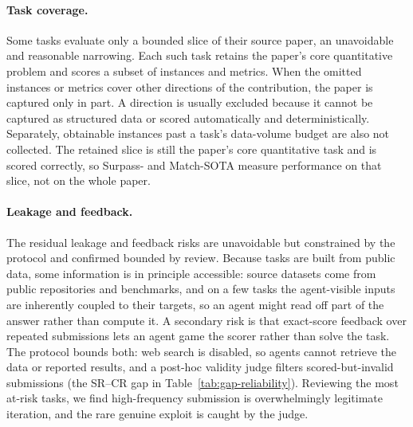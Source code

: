 \paragraph{Task coverage.}
Some tasks evaluate only a bounded slice of their source paper, an unavoidable and reasonable narrowing. Each such task retains the paper's core quantitative problem and scores a subset of instances and metrics. When the omitted instances or metrics cover other directions of the contribution, the paper is captured only in part. A direction is usually excluded because it cannot be captured as structured data or scored automatically and deterministically. Separately, obtainable instances past a task's data-volume budget are also not collected. The retained slice is still the paper's core quantitative task and is scored correctly, so Surpass- and Match-SOTA measure performance on that slice, not on the whole paper.

\paragraph{Leakage and feedback.}
The residual leakage and feedback risks are unavoidable but constrained by the protocol and confirmed bounded by review. Because tasks are built from public data, some information is in principle accessible: source datasets come from public repositories and benchmarks, and on a few tasks the agent-visible inputs are inherently coupled to their targets, so an agent might read off part of the answer rather than compute it. A secondary risk is that exact-score feedback over repeated submissions lets an agent game the scorer rather than solve the task. The protocol bounds both: web search is disabled, so agents cannot retrieve the data or reported results, and a post-hoc validity judge filters scored-but-invalid submissions (the SR--CR gap in Table~\ref{tab:gap-reliability}). Reviewing the most at-risk tasks, we find high-frequency submission is overwhelmingly legitimate iteration, and the rare genuine exploit is caught by the judge.









